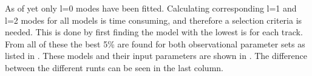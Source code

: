 

As of yet only l=0 modes have been fitted. Calculating corresponding l=1 and l=2 modes for all models is time consuming, and therefore a selection criteria is needed. This is done by first finding the model with the lowest \chis is for each track. From all of these the best 5\% are found for both observational parameter sets as listed in . These models and their input parameters are shown in . The difference between the different runts can be seen in the last column.  

